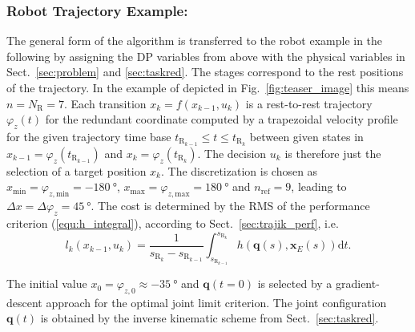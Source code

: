 \documentclass[runningheads]{llncs}
\renewcommand{\vec}[1]{\boldsymbol{#1}}
\begin{document}
\subsubsection{Robot Trajectory Example:}

The general form of the algorithm is transferred to the robot example in the following by assigning the DP variables from above with the physical variables in Sect.~\ref{sec:problem} and \ref{sec:taskred}.
The stages correspond to the rest positions of the trajectory.
In the example of \cite{SchapplerOrt2021} depicted in Fig.~\ref{fig:teaser_image} this means $n={N_\mathrm{R}}=7$.
Each transition $x_k{=}f(x_{k-1},u_k)$ is a rest-to-rest trajectory $\varphi_z(t)$ for the redundant coordinate computed by a trapezoidal velocity profile for the given trajectory time base $t_{\mathrm{R}_{k-1}} \le t \le t_{\mathrm{R}_k}$ between given states in $x_{k-1}=\varphi_z(t_{\mathrm{R}_{k-1}})$ and $x_{k}=\varphi_z(t_{\mathrm{R}_{k}})$.
The decision $u_k$ is therefore just the selection of a target position $x_k$.
The discretization is chosen as $x_\mathrm{min}=\varphi_{z,\mathrm{min}}=\SI{-180}{\degree}$, $x_\mathrm{max}=\varphi_{z,\mathrm{max}}=\SI{180}{\degree}$ and $n_{\mathrm{ref}
}=9$, leading to $\Delta x = \Delta \varphi_{z} = \SI{45}{\degree}$.
The cost is determined by the RMS of the performance criterion (\ref{equ:h_integral}), according to Sect.~\ref{sec:trajik_perf}, i.e.
%
\begin{equation}
l_k(x_{k-1},u_k) =
\frac{1}{s_{\mathrm{R}_k}-s_{\mathrm{R}_{k-1}}}
\int_{s_{\mathrm{R}_{k-1}}}^{s_{\mathrm{R}_{k}}}
h(\vec{q}(s), \vec{x}_E(s))
\mathrm{d}t.
\end{equation}
%


The initial value $x_0=\varphi_{z,0}\approx\SI{-35}{\degree}$ and $\vec{q}(t{=}0)$ is selected by a gradient-descent approach for the optimal joint limit criterion.
The joint configuration $\vec{q}(t)$ is obtained by the inverse kinematic scheme from Sect.~\ref{sec:taskred}.
\end{document}
